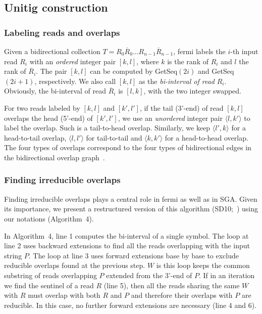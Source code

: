 \documentclass{bioinfo}
\begin{document}
\begin{methods}
\subsection{Unitig construction}

\subsubsection{Labeling reads and overlaps}
Given a bidirectional collection $T=R_0\overline{R}_0\ldots
R_{n-1}\overline{R}_{n-1}$, fermi labels the $i$-th input read $R_i$ with an
\emph{ordered} integer pair $[k,l]$, where $k$ is the rank of $R_i$
and $l$ the rank of $\overline{R}_i$. The pair $[k,l]$ can be computed by
{\sc GetSeq}$(2i)$ and {\sc GetSeq}$(2i+1)$, respectively. We also call
$[k,l]$ as the \emph{bi-interval of read} $R_i$. Obviously, the bi-interval
of read $\overline{R}_i$ is $[l,k]$, with the two integer swapped.

For two reads labeled by $[k,l]$ and $[k',l']$, if the tail (3'-end) of read
$[k,l]$ overlaps the head (5'-end) of $[k',l']$, we use an \emph{unordered}
integer pair $\langle l,k'\rangle$ to label the overlap. Such is a tail-to-head
overlap. Similarly, we keep $\langle l',k\rangle$ for a head-to-tail overlap,
$\langle l,l'\rangle$ for tail-to-tail and $\langle k,k'\rangle$ for a
head-to-head overlap. The four types of overlaps correspond to the four
types of bidirectional edges in the bidirectional overlap
graph~\citep{Myers:1995nx}.

\subsubsection{Finding irreducible overlaps}
Finding irreducible overlaps plays a central role in fermi as well as in SGA.
Given its importance, we present a restructured version of this algorithm
(SD10;~\citealt{Simpson:2010uq}) using our notations (Algorithm~4).

In Algorithm~4, line 1 computes the bi-interval of a single symbol. The loop at
line 2 uses backward extensions to find all the reads overlapping with the
input string $P$. The loop at line 3 uses forward extensions base by base to exclude
reducible overlaps found at the previous step. $W$ is this loop keeps
the common substring of reads overlapping $P$ extended from the 3'-end of $P$. If 
in an iteration we find the sentinel of a read $R$ (line 5), then all the reads sharing
the same $W$ with $R$ must overlap with both $R$ and $P$ and therefore
their overlaps with $P$ are reducible. In this case, no further forward
extensions are necessary (line 4 and 6).


\end{methods}
\end{document}
